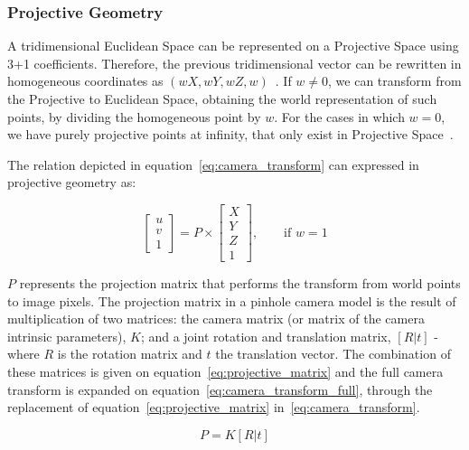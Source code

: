 \subsubsection{Projective Geometry}
A tridimensional Euclidean Space can be represented on a Projective Space using 3+1 coefficients. Therefore, the previous tridimensional vector can be rewritten in homogeneous coordinates as $(wX, wY, wZ, w)$~\cite{mvg_book}. If $w \neq 0$, we can transform from the Projective to Euclidean Space, obtaining the world representation of such points, by dividing the homogeneous point by $w$. For the cases in which $w =  0$, we have purely projective points at infinity, that only exist in Projective Space~\cite{mvg_book}. 

The relation depicted in equation~\ref{eq:camera_transform} can expressed in projective geometry as:

\begin{equation}
	\begin{bmatrix}
		u \\ v \\ 1
	\end{bmatrix}
= P \times 
\begin{bmatrix}
		X \\ Y \\ Z \\ 1
	\end{bmatrix}, \qquad \text{if } w = 1
\end{equation}

$P$ represents the projection matrix that performs the transform from world points to image pixels. The projection matrix in a pinhole camera model is the result of multiplication of two matrices: the camera matrix (or matrix of the camera intrinsic parameters), $K$; and a joint rotation and translation matrix, $[R|t]$ - where $R$ is the rotation matrix and $t$ the translation vector. The combination of these matrices is given on equation~\ref{eq:projective_matrix} and the full camera transform is expanded on equation~\ref{eq:camera_transform_full}, through the replacement of equation~\ref{eq:projective_matrix} in~\ref{eq:camera_transform}.

\begin{equation}
	\label{eq:projective_matrix}
	P = K[R|t]
\end{equation}

